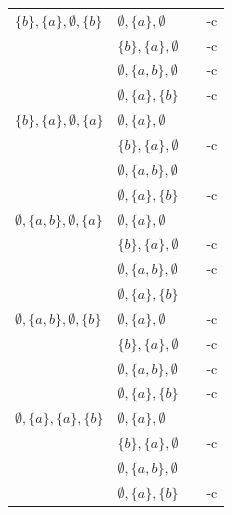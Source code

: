 \begin{longtable}{l | l | l | l}
	\hline
	
	$\{b\},\{a\},\emptyset,\{b\}$ &
	$\emptyset,\{a\},\emptyset$ & {\textXbaebXeae} & \PSPACE-c \\
	& $\{b\},\{a\},\emptyset$ & {\textXbaebXbae} & \PSPACE-c \\
	& $\emptyset,\{a,b\},\emptyset$ & {\textXbaebXeabe} & \PSPACE-c \\
	& $\emptyset,\{a\},\{b\}$ & {\textXbaebXeab} & \PSPACE-c \\
	
	\hline
	
	$\{b\},\{a\},\emptyset,\{a\}$ &
	$\emptyset,\{a\},\emptyset$ & {\textXbaeaXeae} & \NL \\
	& $\{b\},\{a\},\emptyset$ & {\textXbaeaXbae} & \PSPACE-c \\
	& $\emptyset,\{a,b\},\emptyset$ & {\textXbaeaXeabe} & \NL \\
	& $\emptyset,\{a\},\{b\}$ & {\textXbaeaXeab} & \PSPACE-c \\
	
	\hline
	
	$\emptyset,\{a,b\},\emptyset,\{a\}$ &
	$\emptyset,\{a\},\emptyset$ & {\textXeabeaXeae} & \NL \\
	& $\{b\},\{a\},\emptyset$ & {\textXeabeaXbae} & \PSPACE-c \\
	& $\emptyset,\{a,b\},\emptyset$ & {\textXeabeaXeabe} & \PSPACE-c \\
	& $\emptyset,\{a\},\{b\}$ & {\textXeabeaXeab} & \NL \\
	
	\hline
	
	$\emptyset,\{a,b\},\emptyset,\{b\}$ &
	$\emptyset,\{a\},\emptyset$ & {\textXeabebXeae} & \PSPACE-c \\
	& $\{b\},\{a\},\emptyset$ & {\textXeabebXbae} & \PSPACE-c \\
	& $\emptyset,\{a,b\},\emptyset$ & {\textXeabebXeabe} & \PSPACE-c \\
	& $\emptyset,\{a\},\{b\}$ & {\textXeabebXeab} & \PSPACE-c \\
	
	\hline
	
	$\emptyset,\{a\},\{a\},\{b\}$ &
	$\emptyset,\{a\},\emptyset$ & {\textXeaabXeae} & \NL \\
	& $\{b\},\{a\},\emptyset$ & {\textXeaabXbae} & \PSPACE-c \\
	& $\emptyset,\{a,b\},\emptyset$ & {\textXeaabXeabe} & \NL \\
	& $\emptyset,\{a\},\{b\}$ & {\textXeaabXeab} & \PSPACE-c \\
	

\end{longtable}
